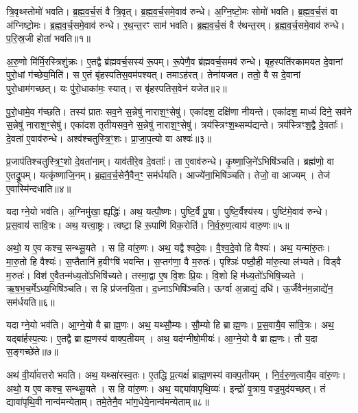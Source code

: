 त्रि॒वृथ्स्तोमो॑ भवति।
ब्र॒ह्म॒व॒र्च॒सं वै त्रि॒वृत्।
ब्र॒ह्म॒व॒र्च॒समे॒वाव॑ रुन्धे।
अ॒ग्नि॒ष्टो॒मः सोमो॑ भवति।
ब्र॒ह्म॒व॒र्च॒सं वा अ॑ग्निष्टो॒मः।
ब्र॒ह्म॒व॒र्च॒समे॒वाव॑ रुन्धे।
र॒थ॒न्त॒रꣳ साम॑ भवति।
ब्र॒ह्म॒व॒र्च॒सं वै र॑थन्त॒रम्।
ब्र॒ह्म॒व॒र्च॒समे॒वाव॑ रुन्धे।
प॒रि॒स्र॒जी होता॑ भवति॥१॥

अ॒रु॒णो मि॑र्मि॒रस्त्रिशु॑क्रः।
ए॒तद्वै ब्र॑ह्मवर्च॒सस्य॑ रू॒पम्।
रू॒पेणै॒व ब्र॑ह्मवर्च॒समव॑ रुन्धे। 
बृह॒स्पति॑रकामयत दे॒वानां पुरो॒धां ग॑च्छेय॒मिति॑।
स ए॒तं बृ॑हस्पतिस॒वम॑पश्यत्।
तमाऽह॑रत्।
तेना॑यजत।
ततो॒ वै स दे॒वानां पुरो॒धाम॑गच्छत्।
यः पु॑रो॒धाका॑मः॒ स्यात्।
स बृ॑हस्पतिस॒वेन॑ यजेत॥२॥

पु॒रो॒धामे॒व ग॑च्छति।
तस्य॑ प्रातः सव॒ने स॒न्नेषु॑ नाराश॒ꣳ॒सेषु॑।
एका॑दश॒ दक्षि॑णा नीयन्ते।
एका॑दश॒ माध्यं॑ दिने॒ सव॑ने स॒न्नेषु॑ नाराश॒ꣳ॒सेषु॑।
एका॑दश तृतीयसव॒ने स॒न्नेषु॑ नाराश॒ꣳ॒सेषु॑।
त्रय॑स्त्रिꣳश॒थ्सम्प॑द्यन्ते।
त्रय॑स्त्रिꣳश॒द्वै दे॒वताः᳚।
दे॒वता॑ ए॒वाव॑रुन्धे।
अश्व॑श्चतुस्त्रि॒ꣳ॒शः।
प्रा॒जा॒प॒त्यो वा अश्वः॑॥३॥

प्र॒जाप॑तिश्चतुस्त्रि॒ꣳ॒शो दे॒वता॑नाम्।
याव॑तीरे॒व दे॒वताः᳚।
ता ए॒वाव॑रुन्धे।
कृ॒ष्णा॒जि॒ने॑\-ऽभिषि॑ञ्चति।
ब्रह्म॑णो॒ वा ए॒तद्रू॒पम्।
यत्कृ॑ष्णाजि॒नम्।
ब्र॒ह्म॒व॒र्च॒सेनै॒वैन॒ꣳ॒ सम॑र्धयति।
आज्ये॑ना॒भिषि॑ञ्चति।
तेजो॒ वा आज्यम्।
तेज॑ ए॒वास्मि॑न्दधाति॥४॥\anuvakamend[होता॑ भवति यजेत॒ वा अश्वो॑ दधाति]

यदाग्ने॒यो भव॑ति।
अ॒ग्निमु॑खा॒ ह्यृद्धिः॑।
अथ॒ यत्पौ॒ष्णः।
पुष्टि॒र्वै पू॒षा।
पुष्टि॒र्वैश्य॑स्य।
पुष्टि॑मे॒वाव॑ रुन्धे।
प्र॒स॒वाय॑ सावि॒त्रः।
अथ॒ यत्त्वा॒ष्ट्रः।
त्वष्टा॒ हि रू॒पाणि॑ विक॒रोति॑।
नि॒र्व॒रु॒ण॒त्वाय॑ वारु॒णः॥५॥

अथो॒ य ए॒व कश्च॒ सन्थ्सू॒यते।
स हि वा॑रु॒णः।
अथ॒ यद्वैश्वदे॒वः।
वै॒श्व॒दे॒वो हि वैश्यः॑।
अथ॒ यन्मा॑रु॒तः।
मा॒रु॒तो हि वैश्यः॑।
स॒प्तैतानि॑ ह॒वीꣳषि॑ भवन्ति।
स॒प्तग॑णा॒ वै म॒रुतः॑।
पृश्ञिः॑ पष्ठौ॒ही मा॑रु॒त्या ल॑भ्यते।
विड्वै म॒रुतः॑।
विश॑ ए॒वैतन्म॑ध्य॒तो॑\-ऽभिषि॑च्यते।
तस्मा॒द्वा ए॒ष वि॒शः प्रि॒यः।
वि॒शो हि म॑ध्य॒तो॑\-ऽभिषि॒च्यते।
ऋ॒ष॒भ॒च॒र्मे\-ऽध्य॒भिषि॑ञ्चति।
स हि प्र॑जनयि॒ता।
द॒ध्ना\-ऽभिषि॑ञ्चति।
ऊर्ग्वा अ॒न्नाद्यं॒ दधि॑।
ऊ॒र्जैवैन॑म॒न्नाद्ये॑न॒ सम॑र्धयति॥६॥\anuvakamend[वा॒रु॒णो विड्वै म॒रुतो॒\-ऽष्टौ च॑]

यदाग्ने॒यो भव॑ति।
आ॒ग्ने॒यो वै ब्राह्म॒णः।
अथ॒ यथ्सौ॒म्यः।
सौ॒म्यो हि ब्राह्म॒णः।
प्र॒स॒वायै॒व सा॑वि॒त्रः।
अथ॒ यद्बा॑र्\mbox{}हस्प॒त्यः।
ए॒तद्वै ब्राह्म॒णस्य॑ वाक्प॒तीयम्।
अथ॒ यद॑ग्नीषो॒मीयः॑।
आ॒ग्ने॒यो वै ब्राह्म॒णः।
तौ य॒दा स॒ङ्गच्छे॑ते॥७॥

अथ॑ वी॒र्या॑वत्तरो भवति।
अथ॒ यथ्सा॑रस्व॒तः।
ए॒तद्धि प्र॒त्यक्षं॑ ब्राह्म॒णस्य॑ वाक्प॒तीयम्।
नि॒र्व॒रु॒ण॒त्वायै॒व वा॑रु॒णः।
अथो॒ य ए॒व कश्च॒ सन्थ्सू॒यते।
स हि वा॑रु॒णः।
अथ॒ यद्द्या॑वापृथि॒व्यः॑।
इन्द्रो॑ वृ॒त्राय॒ वज्र॒मुद॑यच्छत्।
तं द्यावा॑पृथि॒वी नान्व॑मन्येताम्।
तमे॒तेनै॒व भा॑ग॒धेये॒नान्व॑मन्येताम्॥८॥

